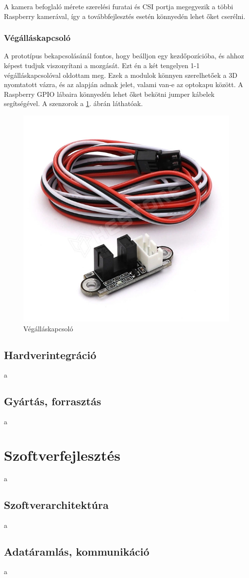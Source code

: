 \documentclass[12pt,a4paper]{article}
\begin{document}
A kamera befoglaló mérete szerelési furatai és CSI portja megegyezik a többi Raspberry kamerával, így a továbbfejlesztés esetén könnyedén lehet őket cserélni.

\subsubsection*{Végálláskapcsoló}
A prototípus bekapcsolásánál fontos, hogy beálljon egy kezdőpozícióba, és ahhoz képest tudjuk viszonyítani a mozgását. Ezt én a két tengelyen 1-1 végálláskapcsolóval oldottam meg. Ezek a modulok könnyen szerelhetőek a 3D nyomtatott vázra, és az alapján adnak jelet, valami van-e az optokapu között. A Raspberry GPIO lábaira könnyedén lehet őket bekötni jumper kábelek segítségével. A szenzorok a \ref{fig:elek_vegallaskapcsolo}. ábrán láthatóak.

\begin{figure}[h!]
	\centering
	\includegraphics[width=0.5\linewidth]{elek_vegallaskapcsolo}
	\caption{Végálláskapcsoló}
	\label{fig:elek_vegallaskapcsolo}
\end{figure}

\subsection{Hardverintegráció}
a
\subsection{Gyártás, forrasztás}
a
\section{Szoftverfejlesztés}
a
\subsection{Szoftverarchitektúra}
a
\subsection{Adatáramlás, kommunikáció}
a
\end{document}
